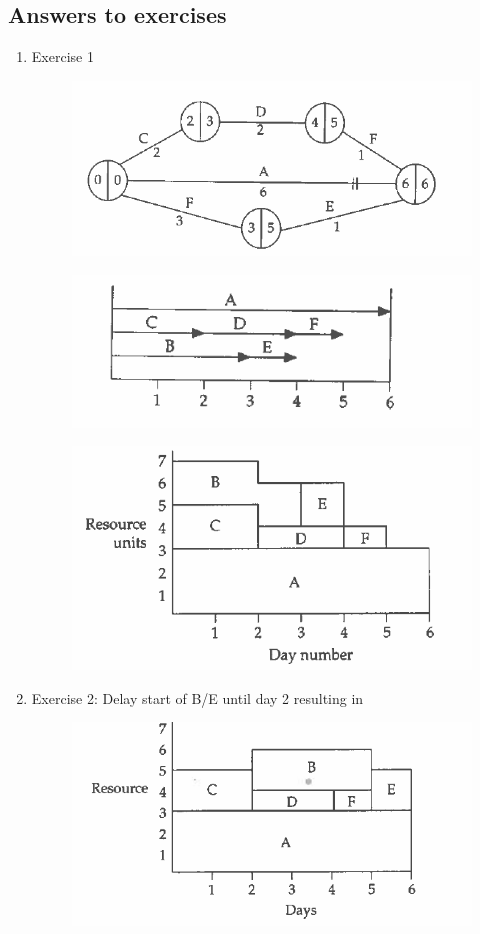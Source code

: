 \documentclass[]{report}
\begin{document}
	\subsection*{Answers to exercises}

\begin{enumerate}
	\item Exercise 1

	\begin{figure}[h!]
\centering
\includegraphics[width=0.4\linewidth]{images4/351-a}
\caption{}
\label{fig:351-a}
\end{figure}
\begin{figure}[h!]
\centering
\includegraphics[width=0.4\linewidth]{images4/351-b}
\caption{}
\label{fig:351-b}
\end{figure}

\begin{figure}[h!]
\centering
\includegraphics[width=0.4\linewidth]{images4/352-a}
\caption{}
\label{fig:352-a}
\end{figure}
\item Exercise 2:  Delay start of B/E until day 2 resulting in 
\begin{figure}[h!]
\centering
\includegraphics[width=0.4\linewidth]{images4/352-b}
\caption{}
\label{fig:352-b}
\end{figure}
\end{enumerate}
	
	
	
\end{document}
